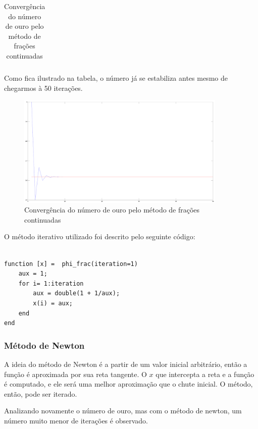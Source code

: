 \documentclass[a4paper]{article}
\begin{document}
\begin{table}[H]
\begin{tabular}{|c|c|c|c|}
	\end{tabular}
	\label{golden_fraction}
	\caption{Convergência do número de ouro pelo método de frações continuadas}
\end{table}

Como fica ilustrado na tabela, o número já se estabiliza antes mesmo de chegarmos à 50 iterações.

\begin{figure}[H]
    \centering
    \includegraphics[width=100mm]{golden_frac.png}
    \caption{Convergência do número de ouro pelo método de frações continuadas}
    \label{golden_frac}
\end{figure}


O método iterativo utilizado foi descrito pelo seguinte código:

\begin{lstlisting}

function [x] =  phi_frac(iteration=1)
	aux = 1;
	for i= 1:iteration
		aux = double(1 + 1/aux);
		x(i) = aux;
	end
end

\end{lstlisting}

\subsubsection{Método de Newton}

A ideia do método de Newton é a partir de um valor inicial arbitrário, então a
função é aproximada por sua reta tangente. O $x$ que intercepta a reta e a
função é computado, e ele será uma melhor aproximação que o chute inicial. O
método, então, pode ser iterado.

Analizando novamente o número de ouro, mas com o método de newton, um número
muito menor de iterações é observado.
\end{document}
